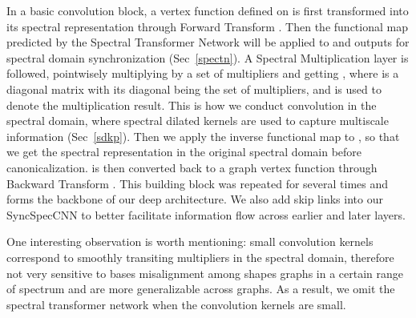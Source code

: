 \documentclass[10pt,twocolumn,letterpaper]{article}
\begin{document}
In a basic convolution block, a vertex function  defined on  is first transformed into its spectral representation  through Forward Transform . Then the functional map  predicted by the Spectral Transformer Network will be applied to  and outputs  for spectral domain synchronization (Sec~\ref{spectn}). A Spectral Multiplication layer is followed, pointwisely multiplying  by a set of multipliers and getting , where  is a diagonal matrix with its diagonal being the set of multipliers, and  is used to denote the multiplication result. This is how we conduct convolution in the spectral domain, where spectral dilated kernels are used to capture multiscale information (Sec~\ref{sdkp}). Then we apply the inverse functional map  to , so that we get the spectral representation  in the original spectral domain before canonicalization.  is then converted back to a graph vertex function through Backward Transform . This building block was repeated for several times and forms the backbone of our deep architecture. We also add skip links into our SyncSpecCNN to better facilitate information flow across earlier and later layers. 


One interesting observation is worth mentioning: small convolution kernels correspond to smoothly transiting multipliers in the spectral domain, therefore not very sensitive to bases misalignment among shapes graphs in a certain range of spectrum and are more generalizable across graphs. As a result, we omit the spectral transformer network when the convolution kernels are small. 
\end{document}
